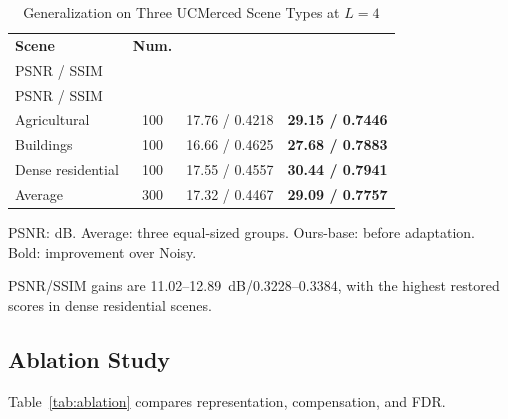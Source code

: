 \documentclass[journal]{IEEEtran}
\newcommand{\rev}[1]{{\color{RevisionBlue}#1}}
\newcommand{\condensed}[1]{{\color{CondensedGreen}#1}}
\newcommand{\rev}[1]{#1}
\newcommand{\condensed}[1]{#1}
\begin{document}
\begin{table}[!t]
\caption{Generalization on Three UCMerced Scene Types at \(L=4\)}
\label{tab:ucm_scenes}
\centering
\footnotesize
\setlength{\tabcolsep}{3.0pt}
\renewcommand{\arraystretch}{1.08}
\begin{tabular*}{\columnwidth}{@{\extracolsep{\fill}}lccc@{}}
\toprule
\textbf{Scene} & \textbf{Num.} &
\shortstack{\textbf{Noisy}\\PSNR / SSIM} &
\shortstack{\textbf{Ours-base}\\PSNR / SSIM} \\
\midrule
Agricultural & 100 & \rev{17.76} / 0.4218 & \textbf{\rev{29.15} / 0.7446} \\
Buildings    & 100 & \rev{16.66} / 0.4625 & \textbf{\rev{27.68} / 0.7883} \\
Dense residential & 100 & \rev{17.55} / 0.4557 & \textbf{\rev{30.44} / 0.7941} \\
\midrule
Average      & 300 & \rev{17.32} / 0.4467 & \textbf{\rev{29.09} / 0.7757} \\
\bottomrule
\end{tabular*}
\vspace{1pt}
\parbox{\columnwidth}{\footnotesize \condensed{PSNR: dB. Average: three equal-sized groups. Ours-base: before adaptation. Bold: improvement over Noisy.}}
\end{table}

\condensed{PSNR/SSIM gains are 11.02--12.89~dB/0.3228--0.3384, with the highest restored scores in dense residential scenes.}

\subsection{Ablation Study}
\condensed{Table~\ref{tab:ablation} compares representation, compensation, and FDR.}
\end{document}
